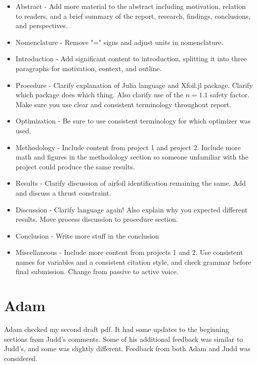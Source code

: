\documentclass[journal ]{new-aiaa}
\begin{document}
\begin{itemize}
    \item Abstract - Add more material to the abstract including motivation, relation to readers, and a brief summary of the report, research, findings, conclusions, and perspectives.
    \item Nomenclature - Remove "=" signs and adjust units in nomenclature.
    \item Introduction - Add significant content to introduction, splitting it into three paragraphs for motivation, context, and outline.
    \item Procedure - Clarify explanation of Julia language and Xfoil.jl package. Clarify which package does which thing. Also clarify use of the $n=1.1$ safety factor. Make sure you use clear and consistent terminology throughout report.
    \item Optimization - Be sure to use consistent terminology for which optimizer was used. 
    \item Methodology - Include content from project 1 and project 2. Include more math and figures in the methodology section so someone unfamiliar with the project could produce the same results.
    \item Results - Clarify discussion of airfoil identification remaining the same. Add and discuss a thrust constraint.
    \item Discussion - Clarify language again! Also explain why you expected different results. Move process discussion to procedure section.
    \item Conclusion - Write more stuff in the conclusion
    \item Miscellaneous - Include more content from projects 1 and 2. Use consistent names for variables and a consistent citation style, and check grammar before final submission. Change from passive to active voice.
\end{itemize}

\section{Adam}

Adam checked my second draft pdf. It had some updates to the beginning sections from Judd's comments. Some of his additional feedback was similar to Judd's, and some was slightly different. Feedback from both Adam and Judd was considered.
\end{document}

